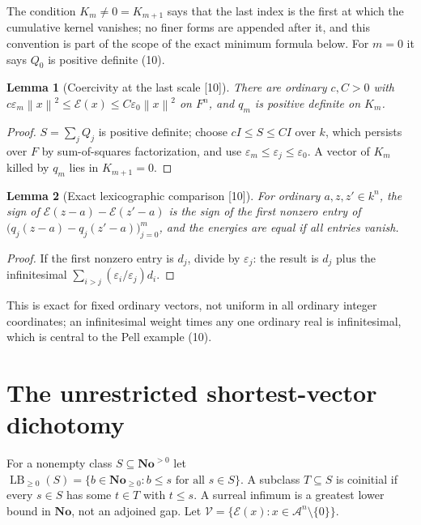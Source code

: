\documentclass[11pt,oneside]{article}
\numberwithin{equation}{section}
\newtheorem{lemma}[lemma]{Lemma}
\theoremstyle{definition}
\theoremstyle{remark}
\newcommand{\No}{\mathbf{No}}
\newcommand{\A}{\mathcal A}
\newcommand{\cE}{\mathcal E}
\newcommand{\LB}{\operatorname{LB}_{\ge0}}
\newcommand{\norm}[1]{\left\lVert #1\right\rVert}
\newcommand{\src}[1]{\textup{\textsf{\small[#1]}}}
\begin{document}
The condition $K_m\ne0=K_{m+1}$ says that the last index is the first at which
the cumulative kernel vanishes; no finer forms are appended after it, and this
convention is part of the scope of the exact minimum formula below. For $m=0$ it
says $Q_0$ is positive definite (10).

\begin{lemma}[Coercivity at the last scale \src{10}]\label{ogl:lat:lem:coercive}
There are ordinary $c,C>0$ with
$c\varepsilon_m\norm{x}^2\le\cE(x)\le C\varepsilon_0\norm{x}^2$ on $F^n$, and $q_m$
is positive definite on $K_m$.
\end{lemma}
\begin{proof}
$S=\sum_jQ_j$ is positive definite; choose $cI\le S\le CI$ over $k$, which
persists over $F$ by sum-of-squares factorization, and use
$\varepsilon_m\le\varepsilon_j\le\varepsilon_0$. A vector of $K_m$ killed by
$q_m$ lies in $K_{m+1}=0$.
\end{proof}

\begin{lemma}[Exact lexicographic comparison \src{10}]\label{ogl:lat:lem:lex}
For ordinary $a,z,z'\in k^n$, the sign of $\cE(z-a)-\cE(z'-a)$ is the sign of
the first nonzero entry of $\bigl(q_j(z-a)-q_j(z'-a)\bigr)_{j=0}^m$, and the
energies are equal if all entries vanish.
\end{lemma}
\begin{proof}
If the first nonzero entry is $d_j$, divide by $\varepsilon_j$: the result is
$d_j$ plus the infinitesimal $\sum_{i>j}(\varepsilon_i/\varepsilon_j)d_i$.
\end{proof}

This is exact for fixed ordinary vectors, not uniform in all ordinary integer
coordinates; an infinitesimal weight times any one ordinary real is
infinitesimal, which is central to the Pell example (10).

\section{The unrestricted shortest-vector dichotomy}\label{ogl:lat:sec:shortest}

For a nonempty class $S\subseteq\No^{>0}$ let
$\LB(S)=\{b\in\No_{\ge0}:b\le s\text{ for all }s\in S\}$. A subclass $T\subseteq S$
is coinitial if every $s\in S$ has some $t\in T$ with $t\le s$. A surreal
infimum is a greatest lower bound in $\No$, not an adjoined gap. Let
$\mathscr V=\{\cE(x):x\in\A^n\setminus\{0\}\}$.
\end{document}

